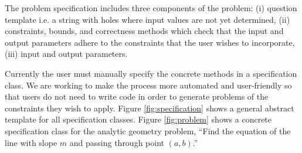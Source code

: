 The problem specification includes three components of the problem: (i) question template i.e. a string with holes where input values are not yet determined, (ii) constraints, bounds, and correctness methods which check that the input and output parameters adhere to the constraints that the user wishes to incorporate, (iii) input and output parameters.

Currently the user must manually specify the concrete methods in a specification class. We are working to make the process more automated and user-friendly so that users do not need to write code in order to generate problems of the constraints they wish to apply. Figure \ref{fig:specification} shows a general abstract template for all specification classes. Figure \ref{fig:problem} shows a concrete specification class for the analytic geometry problem, ``Find the equation of the line with slope $m$ and passing through point $(a, b)$.''

